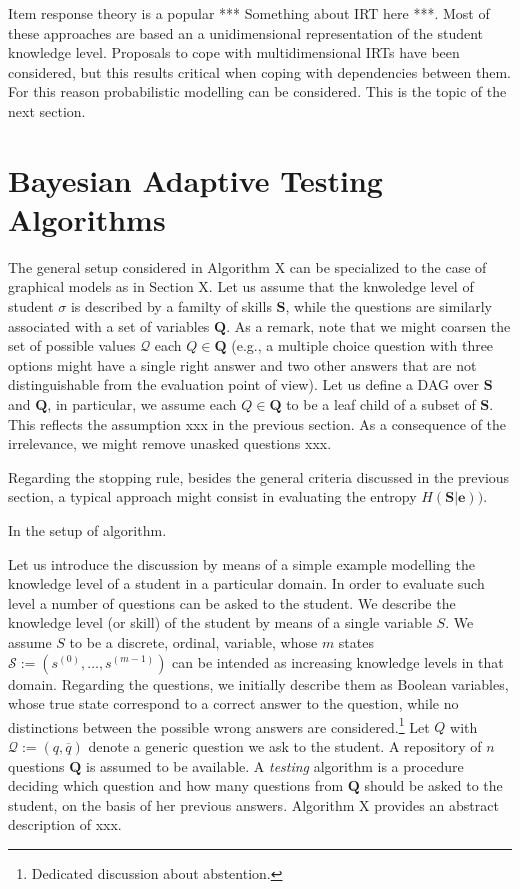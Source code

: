 \documentclass[runningheads]{llncs}
\begin{document}
Item response theory is a popular *** Something about IRT here ***. Most of these approaches are based an a unidimensional representation of the student knowledge level. Proposals to cope with multidimensional IRTs have been considered, but this results critical when coping with dependencies between them. For this reason probabilistic modelling can be considered. This is the topic of the next section.

\section{Bayesian Adaptive Testing Algorithms}
The general setup considered in Algorithm X can be specialized to the case of graphical models as in Section X. Let us assume that the knwoledge level of student $\sigma$ is described by a familty of skills $\bm{S}$, while the questions are similarly associated with a set of variables $\bm{Q}$. As a remark, note that we might coarsen the set of possible values $\mathcal{Q}$ each $Q\in \bm{Q}$ (e.g., a multiple choice question with three options might have a single right answer and two other answers that are not distinguishable from the evaluation point of view). Let us define a DAG over $\bm{S}$ and $\bm{Q}$, in particular, we assume each $Q\in\bm{Q}$ to be a leaf child of a subset of $\bm{S}$. This reflects the assumption xxx in the previous section. As a consequence of the irrelevance, we might remove unasked questions xxx.

Regarding the stopping rule, besides the general criteria discussed in the previous section, a typical approach might consist in evaluating the entropy $H(\bm{S}|\bm{e}))$.


In the setup of algorithm.

Let us introduce the discussion by means of a simple example modelling the knowledge level of a student in a particular domain. In order to evaluate such level a number of questions can be asked to the student. We describe the knowledge level (or skill) of the student by means of a single variable $S$. We assume $S$ to be a discrete, ordinal, variable, whose $m$ states $\mathcal{S}:=(s^{(0)},\ldots,s^{(m-1)})$ can be intended as increasing knowledge levels in that domain. Regarding the questions, we initially describe them as Boolean variables, whose true state correspond to a correct answer to the question, while no distinctions between the possible wrong answers are considered.\footnote{Dedicated discussion about abstention.} Let $Q$ with $\mathcal{Q}:=(q,\overline{q})$ denote a generic question we ask to the student. A repository of $n$ questions $\bm{Q}$ is assumed to be available. A \emph{testing} algorithm is a procedure deciding which question and how many questions from $\bm{Q}$ should be asked to the student, on the basis of her previous answers. Algorithm X provides an abstract description of xxx.
\end{document}
